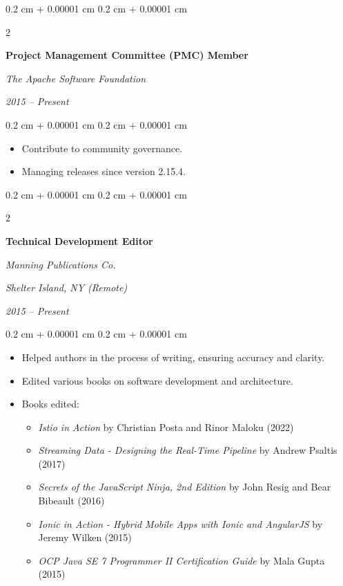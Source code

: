 \documentclass[10pt, a4paper]{article}
\newenvironment{highlights}{
    \begin{itemize}[
        topsep=0.10 cm,
        parsep=0.10 cm,
        partopsep=0pt,
        itemsep=0pt,
        leftmargin=0.4 cm + 10pt
    ]
}{
    \end{itemize}
} %
\newenvironment{onecolentry}{
    \begin{adjustwidth}{
        0.2 cm + 0.00001 cm
    }{
        0.2 cm + 0.00001 cm
    }
}{
    \end{adjustwidth}
} %
\newenvironment{twocolentry}[2][]{
    \onecolentry
    \def\secondColumn{#2}
    \setcolumnwidth{\fill, 8 cm}
    \begin{paracol}{2}
}{
    \switchcolumn \raggedleft \secondColumn
    \end{paracol}
    \endonecolentry
} %
\begin{document}
\vspace{0.20 cm}

\begin{twocolentry}{
        \textit{2015 – Present}}
    \textbf{Project Management Committee (PMC) Member}

    \textit{The Apache Software Foundation}
\end{twocolentry}

\vspace{0.10 cm}
\begin{onecolentry}
    \begin{highlights}
        \item Contribute to community governance.
        \item Managing releases since version 2.15.4.
    \end{highlights}
\end{onecolentry}

\vspace{0.20 cm}

\begin{twocolentry}{
        \textit{Shelter Island, NY (Remote)}

        \textit{2015 – Present}}
    \textbf{Technical Development Editor}

    \textit{Manning Publications Co.}
\end{twocolentry}

\vspace{0.10 cm}
\begin{onecolentry}
    \begin{highlights}
        \item Helped authors in the process of writing, ensuring accuracy and clarity.
        \item Edited various books on software development and architecture.
        \item Books edited:
        \begin{itemize}[leftmargin=0.5cm, topsep=0.0cm, itemsep=0.02cm]
            \item \textit{Istio in Action} by Christian Posta and Rinor Maloku (2022)
            \item \textit{Streaming Data - Designing the Real-Time Pipeline} by Andrew Psaltis (2017)
            \item \textit{Secrets of the JavaScript Ninja, 2nd Edition} by John Resig and Bear Bibeault (2016)
            \item \textit{Ionic in Action - Hybrid Mobile Apps with Ionic and AngularJS} by Jeremy Wilken (2015)
            \item \textit{OCP Java SE 7 Programmer II Certification Guide} by Mala Gupta (2015)
        \end{itemize}
    \end{highlights}
\end{onecolentry}
\end{document}
